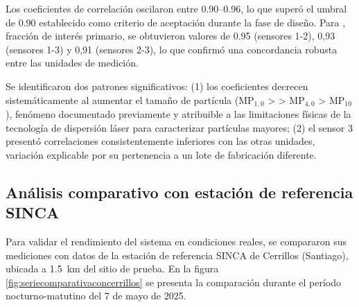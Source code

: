 Los coeficientes de correlación oscilaron entre \SIrange{0.90}{0.96}{}, lo que superó  el umbral de \SI{0.90}{} establecido como criterio de aceptación durante la fase de diseño. Para \MPF, fracción de interés primario, se obtuvieron valores de 0.95 (sensores 1-2), 0,93 (sensores 1-3) y 0,91 (sensores 2-3), lo que confirmó una concordancia robusta entre las unidades de medición.

Se identificaron dos patrones significativos: (1) los coeficientes decrecen sistemáticamente al aumentar el tamaño de partícula (MP$_{1,0}$ > \MPF > MP$_{4,0}$ > MP$_{10}$), fenómeno documentado previamente \citep{Kuula2020, Ellen2021} y atribuible a las limitaciones físicas de la tecnología de dispersión láser para caracterizar partículas mayores; (2) el sensor 3 presentó correlaciones consistentemente inferiores con las otras unidades, variación explicable por su pertenencia a un lote de fabricación diferente.



\subsection{Análisis comparativo con estación de referencia SINCA}

Para validar el rendimiento del sistema en condiciones reales, se compararon sus mediciones con datos de la estación de referencia SINCA de Cerrillos (Santiago), ubicada a \SI{1,5}{\kilo\meter} del sitio de prueba. En la figura \ref{fig:seriecomparativaconcerrillos} se presenta la comparación durante el período nocturno-matutino del 7 de mayo de 2025.


